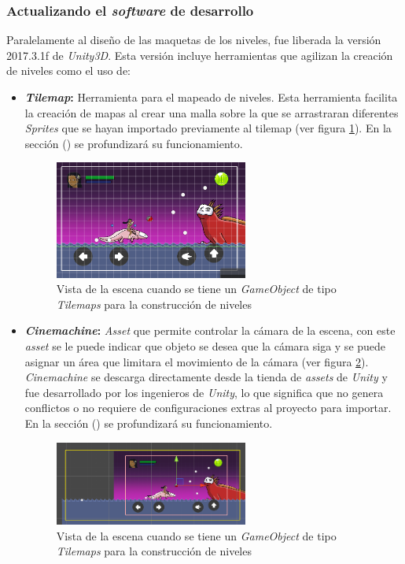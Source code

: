 \subsubsection{Actualizando el \textit{software} de desarrollo}
Paralelamente al diseño de las maquetas de los niveles, fue liberada la versión 
2017.3.1f de \textit{Unity3D}. Esta versión incluye herramientas que agilizan la 
creación de niveles como el uso de: 
	\begin{itemize}
		\item \textbf{\textit{Tilemap}:} Herramienta para el mapeado de niveles. Esta 
		herramienta facilita la creación de mapas al crear una malla sobre la que 
		se arrastraran diferentes \textit{Sprites} que se hayan importado previamente 
		al tilemap (ver figura \ref{fig:TilemapPantalla}). En la sección () se 
		profundizará su funcionamiento.
		
		\begin{figure}[h]
    			\centering
    			\includegraphics[width=0.6\textwidth]{02Antecedentes/Imagenes/tilemaps01.png}
    			\caption{Vista de la escena cuando se tiene un \textit{GameObject} de 
    			tipo \textit{Tilemaps} para la construcción de niveles}
    			\label{fig:TilemapPantalla}
			\end{figure}
		
		\item \textbf{\textit{Cinemachine}:} \textit{Asset} que permite controlar la 
		cámara de la escena, con este \textit{asset} se le puede indicar que objeto se 
		desea que la cámara siga y se puede asignar un área que limitara el movimiento 
		de la cámara (ver figura \ref{fig:CinemaPantalla}). \textit{Cinemachine} se 
		descarga directamente desde la tienda de \textit{assets} de \textit{Unity} y 
		fue desarrollado por los ingenieros de \textit{Unity}, lo que significa que 
		no genera conflictos o no requiere de configuraciones extras al proyecto para 
		importar. En la sección () se profundizará su funcionamiento.
			
			\begin{figure}[h]
    			\centering
    			\includegraphics[width=0.6\textwidth]{02Antecedentes/Imagenes/cinemachine01.png}
    			\caption{Vista de la escena cuando se tiene un \textit{GameObject} de 
    			tipo \textit{Tilemaps} para la construcción de niveles}
    			\label{fig:CinemaPantalla}
			\end{figure}


\end{itemize}
